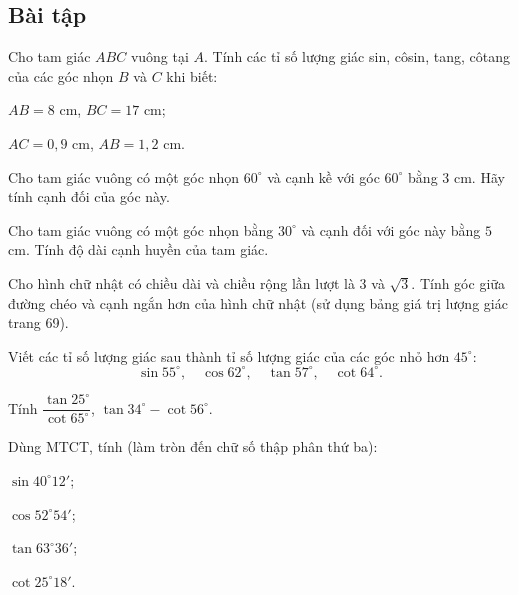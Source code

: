 \begin{exercises}
    \subsection{Bài tập}

    \begin{questions}[series=SGK]
        \item Cho tam giác $ABC$ vuông tại $A$. Tính các tỉ số lượng giác sin, côsin, tang, côtang của các góc nhọn $B$ và $C$ khi biết:
        \begin{questions}
            \item $AB=8$ cm, $BC=17$ cm;
            \item $AC=0{,}9$ cm, $AB=1{,}2$ cm.
        \end{questions}

        \answerline
        \answerline

        \item Cho tam giác vuông có một góc nhọn $60^\circ$ và cạnh kề với góc $60^\circ$ bằng $3$ cm. Hãy tính cạnh đối của góc này.

        \answerline

        \item Cho tam giác vuông có một góc nhọn bằng $30^\circ$ và cạnh đối với góc này bằng $5$ cm. Tính độ dài cạnh huyền của tam giác.

        \answerline

        \item Cho hình chữ nhật có chiều dài và chiều rộng lần lượt là $3$ và $\sqrt3$. Tính góc giữa đường chéo và cạnh ngắn hơn của hình chữ nhật (sử dụng bảng giá trị lượng giác trang 69).

        \answerline

        \item
        \begin{questions}
            \item Viết các tỉ số lượng giác sau thành tỉ số lượng giác của các góc nhỏ hơn $45^\circ$:
            \[
                \sin55^\circ,\quad \cos62^\circ,\quad \tan57^\circ,\quad \cot64^\circ.
            \]

            \answerline
            \item Tính $\dfrac{\tan25^\circ}{\cot65^\circ}$, $\tan34^\circ-\cot56^\circ$.

            \answerline
        \end{questions}

        \item Dùng MTCT, tính (làm tròn đến chữ số thập phân thứ ba):
        \begin{questions}
            \item $\sin40^\circ12'$;
            \item $\cos52^\circ54'$;
            \item $\tan63^\circ36'$;
            \item $\cot25^\circ18'$.
        \end{questions}


\end{questions}
\end{exercises}
